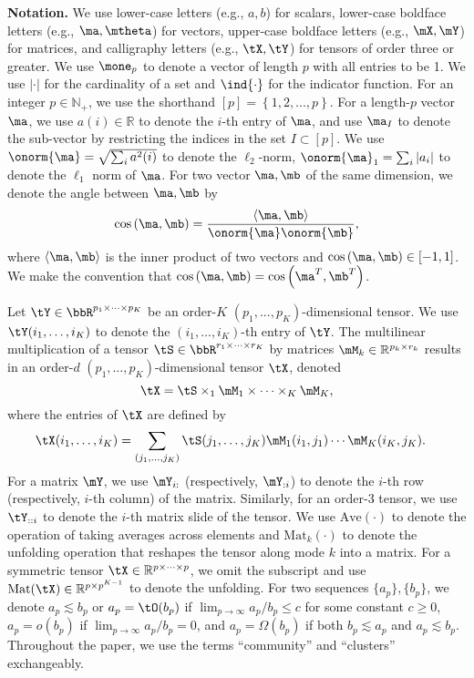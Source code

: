 \documentclass[lettersize,onecolumn,journal]{IEEEtran}
\theoremstyle{definition}
\theoremstyle{definition}
\newcommand{\of}[1]{\left(#1\right)}
\newcommand{\offf}[1]{\left\{#1\right\}}
\newcommand{\ang}[1]{\left\langle#1\right\rangle}
\begin{document}
{\bf Notation.} We use lower-case letters (e.g., $a,b$) for scalars, lower-case boldface letters (e.g., $\ma,\mtheta$) for vectors, upper-case boldface letters (e.g., $\mX,\mY$) for matrices, and calligraphy letters (e.g., $\tX,\tY$) for tensors of order three or greater. We use $\mone_p$ to denote a vector of length $p$ with all entries to be 1. We use $|\cdot|$ for the cardinality of a set and $\ind\{\cdot\}$ for the indicator function. For an integer $p\in\mathbb{N}_{+}$, we use the shorthand $[p]= \offf{1,2,...,p}$. For a length-$p$ vector $\ma$, we use $a(i)\in\mathbb{R}$ to denote the $i$-th entry of $\ma$, and use $\ma_{I}$ to denote the sub-vector by restricting the indices in the set $I\subset [p]$.  We use  $\onorm{\ma}=\sqrt{\sum_{i}a^2(i)}$ to denote the $\ell_2$-norm, $\onorm{\ma}_1=\sum_i |a_i|$ to denote the $\ell_1$ norm of $\ma$. For two vector $\ma, \mb$ of the same dimension, we denote the angle between $\ma, \mb$ by 
\begin{equation}
    \cos \of{\ma, \mb} = \frac{\ang{ \ma, \mb}}{ \onorm{\ma} \onorm{\mb} },
\end{equation}
where $\ang{\ma,\mb}$ is the inner product of two vectors and $\cos \of{\ma, \mb} \in [-1,1]$. We make the convention that $\cos \of{\ma, \mb} = \cos \of{\ma^T, \mb^T}$. 

Let $\tY  \in \bbR^{p_1 \times \cdots \times p_K}$ be an order-$K$ $(p_1,...,p_K)$-dimensional tensor. We use $\tY(i_1,\ldots,i_K)$ to denote the $(i_1,\ldots,i_K)$-th entry of $\tY$. The multilinear multiplication of a tensor $\tS\in \bbR^{r_1\times \cdots \times r_K}$ by matrices $\mM_k \in\mathbb{R}^{p_k\times r_k}$ results in an order-$d$ $(p_1,\ldots,p_K)$-dimensional tensor $\tX$, denoted
\[
\tX=\tS \times_1 \mM_1 \times \cdots \times_K \mM_K,
\]
where the entries of $\tX$ are defined by
\begin{align}
    &\tX(i_1,\ldots, i_K)=\sum_{(j_1,\ldots,j_K)}\tS(j_1,\ldots,j_K)\mM_1(i_1,j_1)\cdots \mM_K(i_K,j_K).
\end{align} 
For a matrix $\mY$, we use $\mY_{i:}$ (respectively, $\mY_{:i}$) to denote the $i$-th row (respectively, $i$-th column) of the matrix. Similarly, for an order-3 tensor, we use $\tY_{::i}$ to denote the $i$-th matrix slide of the tensor. We use $\text{Ave}(\cdot)$ to denote the operation of taking averages across elements and $\text{Mat}_k(\cdot)$ to denote the unfolding operation that reshapes the tensor along mode $k$ into a matrix.   {For a symmetric tensor $\tX \in\mathbb{R}^{p\times \cdots \times p}$, we omit the subscript and use $\text{Mat}(\tX)\in\mathbb{R}^{p\times p^{K-1}}$ to denote the unfolding.}  For two sequences $\{a_p\}, \{b_p\}$, we denote $a_p\lesssim b_p$ or $a_p=\tO(b_p)$ if $\lim_{p\to\infty}a_p /b_p\leq c$ for some constant $c\geq 0$, $a_p=o(b_p)$ if $\lim_{p\to\infty}a_p/b_p =0$, and $a_p = \Omega(b_p)$ if both $b_p \lesssim a_p$ and $a_p\lesssim b_p$. Throughout the paper, we use the terms ``community'' and ``clusters'' exchangeably. 
\end{document}
